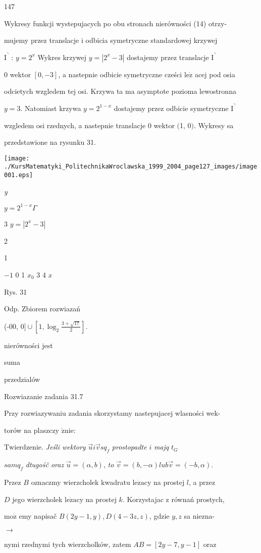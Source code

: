 \documentclass[a4paper,12pt]{article}
\begin{document}
147

Wykresy funkcji wystepujacych po obu stronach nierówności (14) otrzy-

mujemy przez translacje $\mathrm{i}$ odbicia symetryczne standardowej krzywej

$\mathrm{I}^{\urcorner}$ : $y = 2^{x}$ Wykres krzywej $y = |2^{x}-3|$ dostajemy przez translacje $\mathrm{I}^{\urcorner}$

$0$ wektor $[0,-3]$, a nastepnie odbicie symetryczne cześci $\mathrm{l}\mathrm{e}\dot{\mathrm{z}}$ acej pod osia

odcietych wzgledem tej osi. Krzywa ta ma asymptote pozioma lewostronna

$y=3$. Natomiast krzywa $y=2^{1-x}$ dostajemy przez odbicie symetryczne $\mathrm{I}^{\urcorner}$

wzgledem osi rzednych, a nastepnie translacje $0$ wektor $($1, $0)$. Wykresy sa

przedstawione na rysunku 31.
\begin{center}
\texttt{[image: ./KursMatematyki\_PolitechnikaWroclawska\_1999\_2004\_page127\_images/image001.eps]}
\end{center}
{\it y}

$y=2^{1-x}  \Gamma$

3  $y=|2^{x}-3|$

2

1

$-1$  0 1  $x_{0}$  3 4  {\it x}

Rys. 31

Odp. Zbiorem rozwiazań

(-00, $ 0]\cup [1,\displaystyle \log_{2}\frac{3+\sqrt{17}}{2}].$

nierówności jest

suma

przedzialów

Rozwiazanie zadania 31.7

Przy rozwiazywaniu zadania skorzystamy nastepujacej wlasności wek-

torów na plaszczy $\acute{\mathrm{z}}\mathrm{n}\mathrm{i}\mathrm{e}$:

$\mathrm{T}\mathrm{w}\mathrm{i}\mathrm{e}\mathrm{r}\mathrm{d}\mathrm{z}\mathrm{e}\mathrm{n}\mathrm{i}\mathrm{e}$. {\it Jeśli wektory} $\vec{u}i\vec{v}sq_{f}$ {\it prostopadte} $i$ {\it majq} $t_{G}$

$samq_{f}$ {\it dtugośč oraz} $\vec{u}=(\alpha,b)$, {\it to} $\vec{v}=(b,-\alpha) lub\vec{v}=(-b,\alpha).$

Przez $B$ oznaczmy wierzcholek kwadratu $\mathrm{l}\mathrm{e}\dot{\mathrm{z}}\mathrm{a}\mathrm{c}\mathrm{y}$ na prostej $l$, a przez

$D$ jego wierzcholek $\mathrm{l}\mathrm{e}\dot{\mathrm{z}}\mathrm{a}\mathrm{c}\mathrm{y}$ na prostej $k$. Korzystajac $\mathrm{z}$ równań prostych,

$\mathrm{m}\mathrm{o}\dot{\mathrm{z}}$ emy napisač $B(2y-1,y), D(4-3z,z)$, gdzie $y, z$ sa niezna-

$\rightarrow$

nymi rzednymi tych wierzcholków, zatem $AB= [2y-7,y-1]$ oraz
\end{document}
